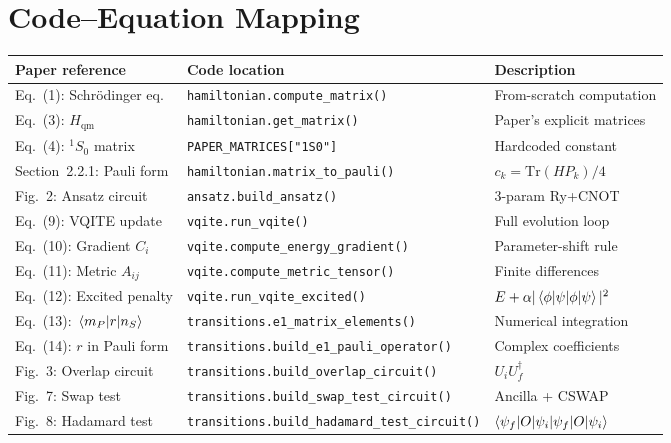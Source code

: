 \documentclass[11pt,a4paper]{article}
\begin{document}
\section{Code--Equation Mapping}

\begin{center}
\begin{tabular}{lll}
\toprule
Paper reference & Code location & Description \\
\midrule
Eq.~(1): Schr\"odinger eq. & \texttt{hamiltonian.compute\_matrix()} & From-scratch computation \\
Eq.~(3): $H_{\text{qm}}$ & \texttt{hamiltonian.get\_matrix()} & Paper's explicit matrices \\
Eq.~(4): ${}^1S_0$ matrix & \texttt{PAPER\_MATRICES["1S0"]} & Hardcoded constant \\
Section~2.2.1: Pauli form & \texttt{hamiltonian.matrix\_to\_pauli()} & $c_k = \text{Tr}(HP_k)/4$ \\
Fig.~2: Ansatz circuit & \texttt{ansatz.build\_ansatz()} & 3-param Ry+CNOT \\
Eq.~(9): VQITE update & \texttt{vqite.run\_vqite()} & Full evolution loop \\
Eq.~(10): Gradient $C_i$ & \texttt{vqite.compute\_energy\_gradient()} & Parameter-shift rule \\
Eq.~(11): Metric $A_{ij}$ & \texttt{vqite.compute\_metric\_tensor()} & Finite differences \\
Eq.~(12): Excited penalty & \texttt{vqite.run\_vqite\_excited()} & $E + \alpha|\braket{\phi|\psi}|^2$ \\
Eq.~(13): $\mel{m_P}{r}{n_S}$ & \texttt{transitions.e1\_matrix\_elements()} & Numerical integration \\
Eq.~(14): $r$ in Pauli form & \texttt{transitions.build\_e1\_pauli\_operator()} & Complex coefficients \\
Fig.~3: Overlap circuit & \texttt{transitions.build\_overlap\_circuit()} & $U_i U_f^\dagger$ \\
Fig.~7: Swap test & \texttt{transitions.build\_swap\_test\_circuit()} & Ancilla + CSWAP \\
Fig.~8: Hadamard test & \texttt{transitions.build\_hadamard\_test\_circuit()} & $\braket{\psi_f|O|\psi_i}$ \\
\bottomrule
\end{tabular}
\end{center}


\end{document}
